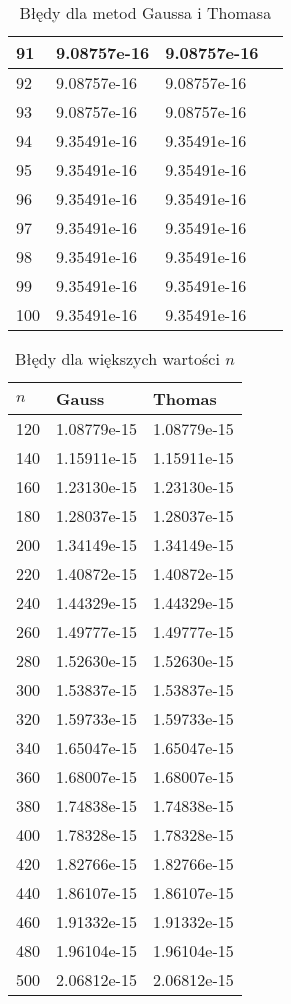 \documentclass{article}
\begin{document}
\begin{table}[H]
{\begin{tabular}{|l|l|l|l|}
91 & 9.08757e-16 & 9.08757e-16 \\ \hline
92 & 9.08757e-16 & 9.08757e-16 \\ \hline
93 & 9.08757e-16 & 9.08757e-16 \\ \hline
94 & 9.35491e-16 & 9.35491e-16 \\ \hline
95 & 9.35491e-16 & 9.35491e-16 \\ \hline
96 & 9.35491e-16 & 9.35491e-16 \\ \hline
97 & 9.35491e-16 & 9.35491e-16 \\ \hline
98 & 9.35491e-16 & 9.35491e-16 \\ \hline
99 & 9.35491e-16 & 9.35491e-16 \\ \hline
100 & 9.35491e-16 & 9.35491e-16 \\ \hline
\end{tabular}
}
\caption{Błędy dla metod Gaussa i Thomasa}
\end{table}

\begin{table}[H]
\centering
\begin{tabular}{|l|l|l|}
\hline
$n$ & Gauss & Thomas \\ \hline
120 & 1.08779e-15 & 1.08779e-15 \\ \hline
140 & 1.15911e-15 & 1.15911e-15 \\ \hline
160 & 1.23130e-15 & 1.23130e-15 \\ \hline
180 & 1.28037e-15 & 1.28037e-15 \\ \hline
200 & 1.34149e-15 & 1.34149e-15 \\ \hline
220 & 1.40872e-15 & 1.40872e-15 \\ \hline
240 & 1.44329e-15 & 1.44329e-15 \\ \hline
260 & 1.49777e-15 & 1.49777e-15 \\ \hline
280 & 1.52630e-15 & 1.52630e-15 \\ \hline
300 & 1.53837e-15 & 1.53837e-15 \\ \hline
320 & 1.59733e-15 & 1.59733e-15 \\ \hline
340 & 1.65047e-15 & 1.65047e-15 \\ \hline
360 & 1.68007e-15 & 1.68007e-15 \\ \hline
380 & 1.74838e-15 & 1.74838e-15 \\ \hline
400 & 1.78328e-15 & 1.78328e-15 \\ \hline
420 & 1.82766e-15 & 1.82766e-15 \\ \hline
440 & 1.86107e-15 & 1.86107e-15 \\ \hline
460 & 1.91332e-15 & 1.91332e-15 \\ \hline
480 & 1.96104e-15 & 1.96104e-15 \\ \hline
500 & 2.06812e-15 & 2.06812e-15 \\ \hline
\end{tabular}
\caption{Błędy dla większych wartości $n$}
\end{table}
\end{document}

